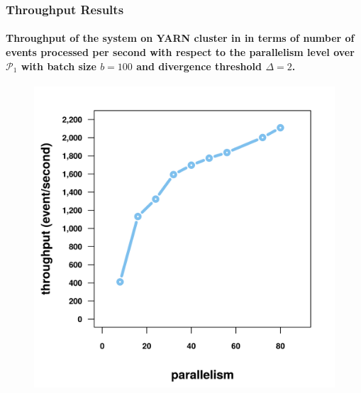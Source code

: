 \begin{frame}
	
	\frametitle{Throughput Results}
	\framesubtitle{Throughput of the system on YARN cluster in in terms of number of events processed per second with respect to the parallelism level over $\mathcal{P}_1$ with batch size $b=100$ and divergence threshold $\Delta=2$.}
	
	\begin{figure}[H]
		
		\includegraphics[width=.8\textwidth,height=.75\textheight]{../chapters/figures/throughput/temp.png}
		
	
	\end{figure}
	
\end{frame}